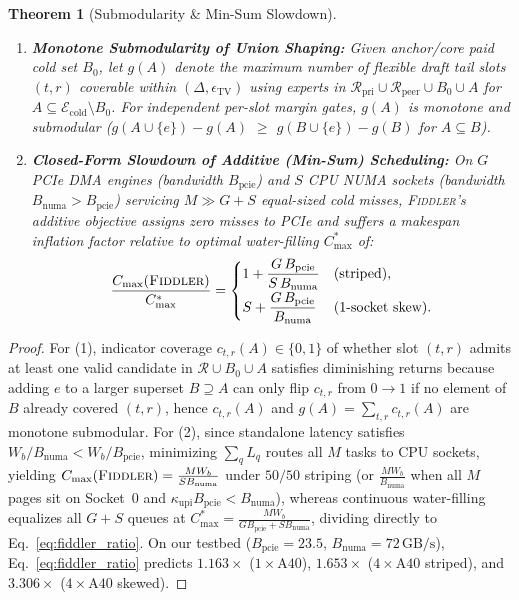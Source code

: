 \documentclass[10pt,twocolumn]{article}
\newtheorem{theorem}{Theorem}
\theoremstyle{definition}
\begin{document}
\begin{theorem}[Submodularity \& Min-Sum Slowdown]
\label{thm:submod_sched}
\begin{enumerate}
  \item \textbf{Monotone Submodularity of Union Shaping:} Given anchor/core paid cold set $B_0$, let $g(A)$ denote the maximum number of flexible draft tail slots $(t, r)$ coverable within $(\Delta, \epsilon_{\mathrm{TV}})$ using experts in $\mathcal{R}_{\mathrm{pri}} \cup \mathcal{R}_{\mathrm{peer}} \cup B_0 \cup A$ for $A \subseteq \mathcal{E}_{\mathrm{cold}} \setminus B_0$. For independent per-slot margin gates, $g(A)$ is monotone and submodular ($g(A \cup \{e\}) - g(A)$ $\ge$ $g(B \cup \{e\}) - g(B)$ for $A \subseteq B$).
  \item \textbf{Closed-Form Slowdown of Additive (\emph{Min-Sum}) Scheduling:} On $G$ PCIe DMA engines (bandwidth $B_{\mathrm{pcie}}$) and $S$ CPU NUMA sockets (bandwidth $B_{\mathrm{numa}} > B_{\mathrm{pcie}}$) servicing $M \gg G + S$ equal-sized cold misses, \textsc{Fiddler}'s additive objective assigns zero misses to PCIe and suffers a makespan inflation factor relative to optimal water-filling $C^*_{\max}$ of:
  \begin{equation}
    \frac{C_{\max}(\textsc{Fiddler})}{C^*_{\max}} =
    \begin{cases}
      1 + \dfrac{G\,B_{\mathrm{pcie}}}{S\,B_{\mathrm{numa}}} & \text{(striped)}, \\[6pt]
      S + \dfrac{G\,B_{\mathrm{pcie}}}{B_{\mathrm{numa}}} & \text{(1-socket skew)}.
    \end{cases}
    \label{eq:fiddler_ratio}
  \end{equation}
\end{enumerate}
\end{theorem}

\begin{proof}
For (1), indicator coverage $c_{t,r}(A) \in \{0,1\}$ of whether slot $(t,r)$ admits at least one valid candidate in $\mathcal{R} \cup B_0 \cup A$ satisfies diminishing returns because adding $e$ to a larger superset $B \supseteq A$ can only flip $c_{t,r}$ from $0 \to 1$ if no element of $B$ already covered $(t,r)$, hence $c_{t,r}(A)$ and $g(A) = \sum_{t,r} c_{t,r}(A)$ are monotone submodular. For (2), since standalone latency satisfies $W_b / B_{\mathrm{numa}} < W_b / B_{\mathrm{pcie}}$, minimizing $\sum_q L_q$ routes all $M$ tasks to CPU sockets, yielding $C_{\max}(\textsc{Fiddler}) = \frac{M W_b}{S B_{\mathrm{numa}}}$ under $50/50$ striping (or $\frac{M W_b}{B_{\mathrm{numa}}}$ when all $M$ pages sit on Socket~0 and $\kappa_{\mathrm{upi}} B_{\mathrm{pcie}} < B_{\mathrm{numa}}$), whereas continuous water-filling equalizes all $G+S$ queues at $C^*_{\max} = \frac{M W_b}{G B_{\mathrm{pcie}} + S B_{\mathrm{numa}}}$, dividing directly to Eq.~\eqref{eq:fiddler_ratio}. On our testbed ($B_{\mathrm{pcie}}=23.5$, $B_{\mathrm{numa}}=72\,\text{GB/s}$), Eq.~\eqref{eq:fiddler_ratio} predicts $1.163\times$ ($1\times\text{A40}$), $1.653\times$ ($4\times\text{A40}$ striped), and $3.306\times$ ($4\times\text{A40}$ skewed).
\end{proof}
\end{document}
